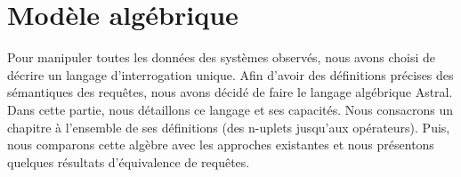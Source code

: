 \part{Modèle algébrique}
Pour manipuler toutes les données des systèmes observés, nous avons choisi de décrire un langage d'interrogation unique. Afin d'avoir des définitions précises des sémantiques des requêtes, nous avons décidé de faire le langage algébrique Astral. Dans cette partie, nous détaillons ce langage et ses capacités. Nous consacrons un chapitre à l'ensemble de ses définitions (des n-uplets jusqu'aux opérateurs). Puis, nous comparons cette algèbre avec les approches existantes et nous présentons quelques résultats d'équivalence de requêtes.




